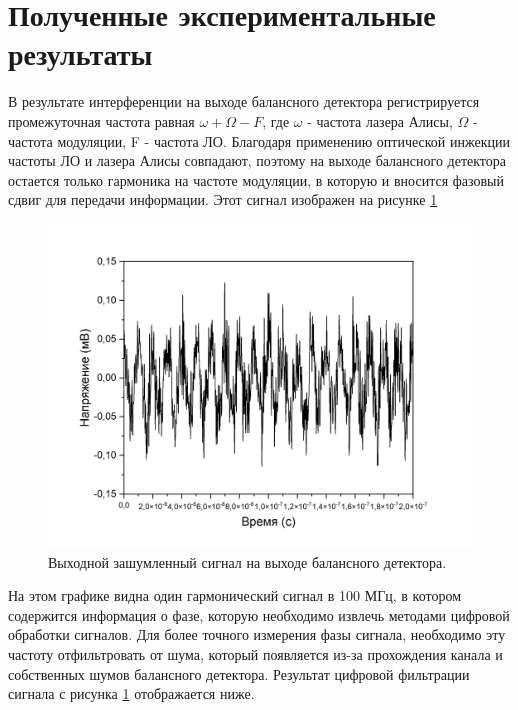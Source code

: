 \section{Полученные экспериментальные результаты}\label{sec:ch2/sect6}

В результате интерференции на выходе балансного детектора регистрируется промежуточная частота равная $\omega + \Omega - F$, где $\omega$ - частота лазера Алисы, $\Omega$ - частота модуляции, F - частота ЛО. Благодаря применению оптической инжекции частоты ЛО и лазера Алисы совпадают, поэтому на выходе балансного детектора остается только гармоника на частоте модуляции, в которую и вносится фазовый сдвиг для передачи информации. Этот сигнал изображен на рисунке \ref{fig:100 MHZ filt ch2}
\begin{figure}
    \centering
    \includegraphics[width=\linewidth]{images/сигнал после бд с новыми шкалами.png}
    \caption{Выходной зашумленный сигнал на выходе балансного детектора.}
    \label{fig:100 MHZ filt ch2}
\end{figure}
На этом графике видна один гармонический сигнал в 100 МГц, в котором содержится информация о фазе, которую необходимо извлечь методами цифровой обработки сигналов. Для более точного измерения фазы сигнала, необходимо эту частоту отфильтровать от шума, который появляется из-за прохождения канала и собственных шумов балансного детектора. Результат цифровой фильтрации сигнала с рисунка \ref{fig:100 MHZ filt ch2} отображается ниже. 
